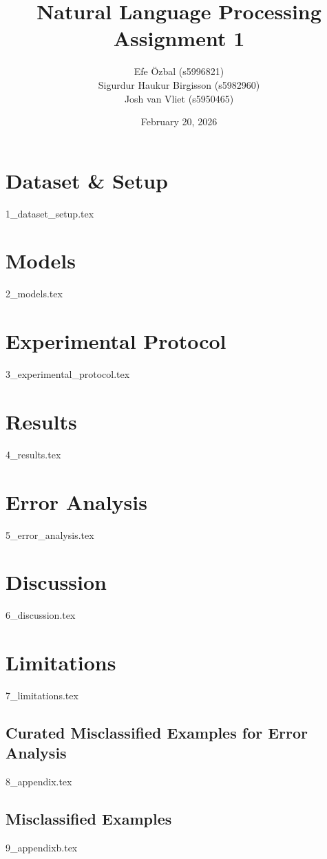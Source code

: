 \documentclass{article}
\title{\textbf{Natural Language Processing\\
Assignment 1}}
\author{Efe Özbal (s5996821) \\ Sigurdur Haukur Birgisson (s5982960) \\ Josh van Vliet (s5950465)}
\date{February 20, 2026}
\begin{document}
\maketitle

\section{Dataset \& Setup}
{1_dataset_setup.tex}

\section{Models}
{2_models.tex}

\section{Experimental Protocol}
{3_experimental_protocol.tex}

\section{Results}
{4_results.tex}

\section{Error Analysis}
{5_error_analysis.tex}

\section{Discussion}
{6_discussion.tex}

\section{Limitations}
{7_limitations.tex}



\newpage

\appendix
\newpage
{}
\begin{landscape}

\section{Curated Misclassified Examples for Error Analysis}
\label{sec:appendix-misclassified-examples}
{8_appendix.tex}

\end{landscape}
\restoregeometry

\newpage
{} %
\begin{landscape}

\section{Misclassified Examples}
\label{sec:appendix-misclassified-examples-full}
{9_appendixb.tex}

\end{landscape}
\restoregeometry
\end{document}
